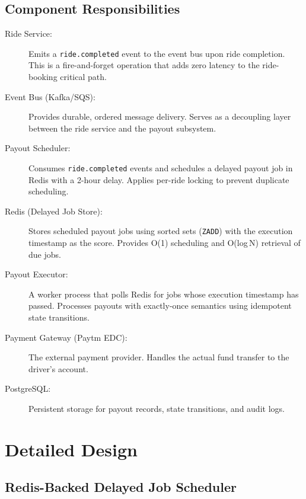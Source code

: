 \documentclass[12pt,a4paper,oneside]{report}
\begin{document}
\subsection{Component Responsibilities}

\begin{description}
    \item[Ride Service:] Emits a \texttt{ride.completed} event to the event bus upon ride completion. This is a fire-and-forget operation that adds zero latency to the ride-booking critical path.

    \item[Event Bus (Kafka/SQS):] Provides durable, ordered message delivery. Serves as a decoupling layer between the ride service and the payout subsystem.

    \item[Payout Scheduler:] Consumes \texttt{ride.completed} events and schedules a delayed payout job in Redis with a 2-hour delay. Applies per-ride locking to prevent duplicate scheduling.

    \item[Redis (Delayed Job Store):] Stores scheduled payout jobs using sorted sets (\texttt{ZADD}) with the execution timestamp as the score. Provides O(1) scheduling and O(log\,N) retrieval of due jobs.

    \item[Payout Executor:] A worker process that polls Redis for jobs whose execution timestamp has passed. Processes payouts with exactly-once semantics using idempotent state transitions.

    \item[Payment Gateway (Paytm EDC):] The external payment provider. Handles the actual fund transfer to the driver's account.

    \item[PostgreSQL:] Persistent storage for payout records, state transitions, and audit logs.
\end{description}

\section{Detailed Design}

\subsection{Redis-Backed Delayed Job Scheduler}
\end{document}

